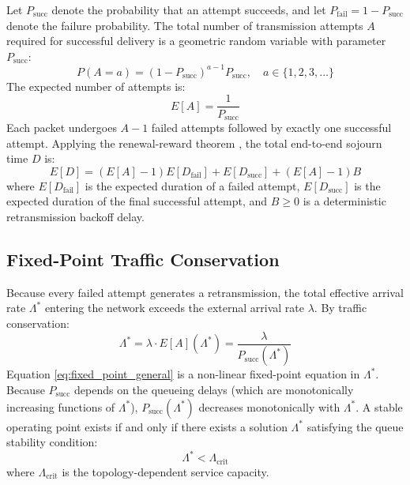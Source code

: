 \documentclass[journal,compsoc]{IEEEtran}
\begin{document}
Let $P_{\text{succ}}$ denote the probability that an attempt succeeds, and let $P_{\text{fail}} = 1 - P_{\text{succ}}$ denote the failure probability. The total number of transmission attempts $A$ required for successful delivery is a geometric random variable with parameter $P_{\text{succ}}$:
\begin{equation}
P(A = a) = (1 - P_{\text{succ}})^{a-1} P_{\text{succ}}, \quad a \in \{1, 2, 3, \dots\}
\end{equation}
The expected number of attempts is:
\begin{equation}
E[A] = \frac{1}{P_{\text{succ}}}
\end{equation}
Each packet undergoes $A - 1$ failed attempts followed by exactly one successful attempt. Applying the renewal-reward theorem \cite{ross1996stochastic}, the total end-to-end sojourn time $D$ is:
\begin{equation}
E[D] = (E[A] - 1) E[D_{\text{fail}}] + E[D_{\text{succ}}] + (E[A] - 1) B
\label{eq:general_delay}
\end{equation}
where $E[D_{\text{fail}}]$ is the expected duration of a failed attempt, $E[D_{\text{succ}}]$ is the expected duration of the final successful attempt, and $B \ge 0$ is a deterministic retransmission backoff delay.

\subsection{Fixed-Point Traffic Conservation}
Because every failed attempt generates a retransmission, the total effective arrival rate $\Lambda^*$ entering the network exceeds the external arrival rate $\lambda$. By traffic conservation:
\begin{equation}
\Lambda^* = \lambda \cdot E[A](\Lambda^*) = \frac{\lambda}{P_{\text{succ}}(\Lambda^*)}
\label{eq:fixed_point_general}
\end{equation}
Equation \eqref{eq:fixed_point_general} is a non-linear fixed-point equation in $\Lambda^*$. Because $P_{\text{succ}}$ depends on the queueing delays (which are monotonically increasing functions of $\Lambda^*$), $P_{\text{succ}}(\Lambda^*)$ decreases monotonically with $\Lambda^*$. A stable operating point exists if and only if there exists a solution $\Lambda^*$ satisfying the queue stability condition:
\begin{equation}
\Lambda^* < \Lambda_{\text{crit}}
\end{equation}
where $\Lambda_{\text{crit}}$ is the topology-dependent service capacity.
\end{document}
